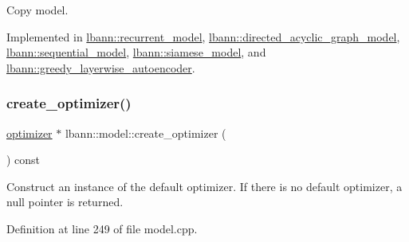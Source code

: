 Copy model. 

Implemented in \hyperlink{classlbann_1_1recurrent__model_ad184f898241fe026f140db689f129d47}{lbann\+::recurrent\+\_\+model}, \hyperlink{classlbann_1_1directed__acyclic__graph__model_a6a21050a732686e9e6c9f384ff9fda51}{lbann\+::directed\+\_\+acyclic\+\_\+graph\+\_\+model}, \hyperlink{classlbann_1_1sequential__model_a548d44a9c4c6bec3680d60b20ac9bd73}{lbann\+::sequential\+\_\+model}, \hyperlink{classlbann_1_1siamese__model_a26bbedec5306e47e214124cca2cb381b}{lbann\+::siamese\+\_\+model}, and \hyperlink{classlbann_1_1greedy__layerwise__autoencoder_a435fa0830662ebde904b9e70902f7e16}{lbann\+::greedy\+\_\+layerwise\+\_\+autoencoder}.

\mbox{\label{classlbann_1_1model_a0d2d5a1eac592e5721a81a9b9ea4b7f2}} 
\subsubsection{\texorpdfstring{create\+\_\+optimizer()}{create\_optimizer()}}
{\footnotesize\ttfamily \hyperlink{classlbann_1_1optimizer}{optimizer} $\ast$ lbann\+::model\+::create\+\_\+optimizer (\begin{DoxyParamCaption}{ }\end{DoxyParamCaption}) const}

Construct an instance of the default optimizer. If there is no default optimizer, a null pointer is returned. 

Definition at line 249 of file model.\+cpp.


